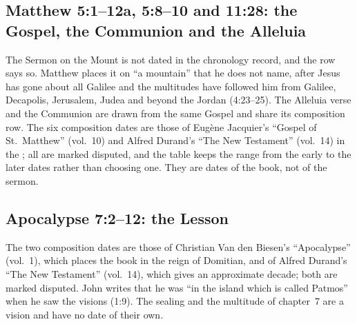 \subsection{Matthew 5:1--12a, 5:8--10 and 11:28: the Gospel, the Communion and the Alleluia}
\label{sec:date-matthew}

The Sermon on the Mount is not dated in the chronology record, and the row
says so. Matthew places it on ``a mountain'' that he does not name, after
Jesus has gone about all Galilee and the multitudes have followed him from
Galilee, Decapolis, Jerusalem, Judea and beyond the Jordan (4:23--25). The
Alleluia verse and the Communion are drawn from the same Gospel and share its
composition row. The six composition dates are those of Eugène Jacquier's
``Gospel of St.~Matthew'' (vol.~10) and Alfred Durand's ``The New Testament''
(vol.~14) in the ; all are marked disputed, and the
table keeps the range from the early to the later dates rather than choosing
one. They are dates of the book, not of the sermon.

\subsection{Apocalypse 7:2--12: the Lesson}
\label{sec:date-apocalypse}

The two composition dates are those of Christian Van den Biesen's
``Apocalypse'' (vol.~1), which places the book in the reign of Domitian, and
of Alfred Durand's ``The New Testament'' (vol.~14), which gives an approximate
decade; both are marked disputed. John writes
that he was ``in the island which is called Patmos'' when he saw the visions
(1:9). The sealing and the multitude of chapter~7 are a vision and have no date
of their own.
